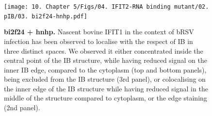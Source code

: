 \begin{figure}
    \centering
    \texttt{[image: 10. Chapter 5/Figs/04. IFIT2-RNA binding mutant/02. pIB/03. bi2f24-hnhp.pdf]}
    \caption[bi2f24 + hnhp]{\textbf{bi2f24 + hnhp.} Nascent bovine IFIT1 in the context of bRSV infection has been observed to localise with the respect of IB in three distinct spaces. We observed it either concentrated inside the central point of the IB structure, while having reduced signal on the inner IB edge, compared to the cytoplasm (top and bottom panels), being excluded from the IB structure (3rd panel), or colocalising on the inner edge of the IB structure while having reduced signal in the middle of the structure compared to cytoplasm, or the edge staining (2nd panel).}
    \label{fig:bi2f24 + hnhp}
\end{figure}

